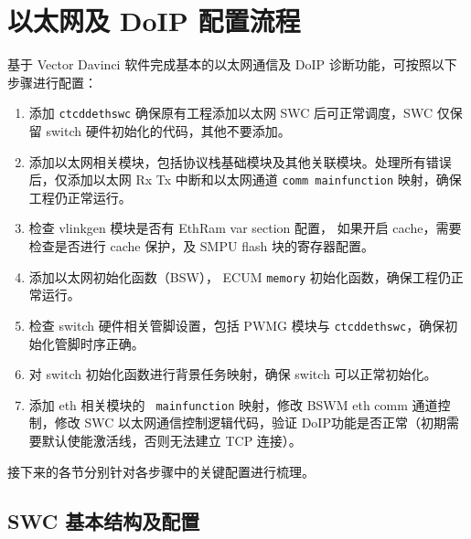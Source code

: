 \section{以太网及 DoIP 配置流程}

基于 Vector Davinci 软件完成基本的以太网通信及 DoIP 诊断功能，可按照以下步骤进行配置：

\begin{enumerate}
    \item 添加 \lstinline{ctcddethswc} 确保原有工程添加以太网 SWC 后可正常调度，SWC 仅保留 switch 硬件初始化的代码，其他不要添加。
    \item 添加以太网相关模块，包括协议栈基础模块及其他关联模块。处理所有错误后，仅添加以太网 Rx Tx 中断和以太网通道 \lstinline{comm mainfunction} 映射，确保工程仍正常运行。
    \item 检查 vlinkgen 模块是否有 EthRam var section 配置， 如果开启 cache，需要检查是否进行 cache 保护，及 SMPU flash 块的寄存器配置。
    \item 添加以太网初始化函数（BSW）， ECUM \lstinline{memory} 初始化函数，确保工程仍正常运行。
    \item 检查 switch 硬件相关管脚设置，包括 PWMG 模块与 \lstinline{ctcddethswc}，确保初始化管脚时序正确。
    \item 对 switch 初始化函数进行背景任务映射，确保 switch 可以正常初始化。
    \item 添加 eth 相关模块的 \lstinline{ mainfunction} 映射，修改 BSWM eth comm 通道控制，修改 SWC 以太网通信控制逻辑代码，验证 DoIP功能是否正常（初期需要默认使能激活线，否则无法建立 TCP 连接）。
\end{enumerate} 

接下来的各节分别针对各步骤中的关键配置进行梳理。

\subsection{SWC 基本结构及配置}